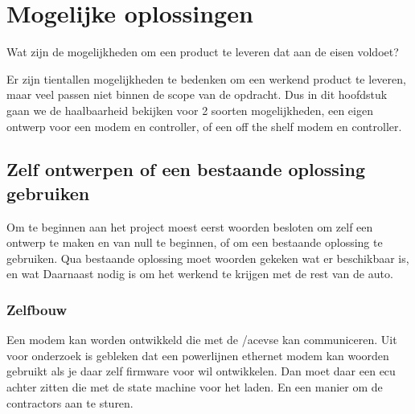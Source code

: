 \chapter{Mogelijke oplossingen}
\label{Mogelijke_oplossingen}

\begin{center}
    \begin{minipage}{0.5\textwidth}
        \begin{small}
            Wat zijn de mogelijkheden om een product te leveren dat aan de
            eisen voldoet?
        \end{small} 
    \end{minipage}
    \vspace{0.5cm}
\end{center}

Er zijn tientallen  mogelijkheden te bedenken om een werkend product te
leveren, maar veel passen niet binnen de scope van de opdracht. Dus in dit
hoofdstuk gaan we de haalbaarheid bekijken voor 2 soorten mogelijkheden, een
eigen ontwerp voor een modem en controller, of een off the shelf modem en
controller.

\section{Zelf ontwerpen of een bestaande oplossing gebruiken}

Om te beginnen aan het project moest eerst woorden besloten om zelf een ontwerp
te maken en van null te beginnen, of om een bestaande oplossing te gebruiken.
Qua bestaande oplossing moet woorden gekeken wat er beschikbaar is, en wat
Daarnaast nodig is om het werkend te krijgen met de rest van de auto.

\subsection{Zelfbouw}

Een modem kan worden ontwikkeld die met de /ac{evse} kan communiceren. Uit voor
onderzoek is gebleken dat een powerlijnen ethernet modem kan woorden gebruikt
als je daar zelf firmware voor wil ontwikkelen. Dan moet daar een \ac{ecu}
achter zitten die met de state machine voor het laden. En een manier om de
contractors aan te sturen.

